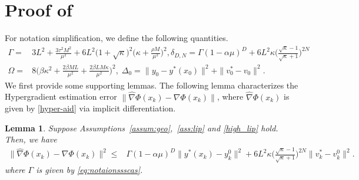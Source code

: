 \documentclass{osudissert96}
\newtheorem{lemma}{Lemma}
\begin{document}
\section{Proof of }\label{appen:aid-bio}
For notation simplification, we define the following quantities. 
{\small\begin{align}\label{eq:notaionssscas}
\Gamma =&3L^2+\frac{3\tau^2 M^2}{\mu^2} + 6L^2\big(1+\sqrt{\kappa}\big)^2\big(\kappa +\frac{\rho M}{\mu^2}\big)^2, \delta_{D,N}=\Gamma (1-\alpha \mu)^D  + 6L^2 \kappa \big( \frac{\sqrt{\kappa}-1}{\sqrt{\kappa}+1} \big)^{2N}
\nonumber
\\\Omega =&8\Big(\beta\kappa^2+\frac{2\beta ML}{\mu^2}+\frac{2\beta LM\kappa}{\mu^2}\Big)^2,\; \Delta_0 = \|y_0-y^*(x_{0})\|^2 + \|v_{0}^*-v_0\|^2.
\end{align}}
\hspace{-0.15cm}We first provide some supporting lemmas. The following lemma 
characterizes the Hypergradient estimation error $\|\widehat \nabla \Phi(x_k)- \nabla \Phi(x_k)\|$, where $\widehat \nabla \Phi(x_k)$ is given by \cref{hyper-aid} via implicit differentiation. 
\begin{lemma}\label{le:aidhy}
Suppose Assumptions~\ref{assum:geo},~\ref{ass:lip} and \ref{high_lip} hold.  
Then, we have 
\begin{align}
\|\widehat \nabla \Phi(x_k)- \nabla \Phi(x_k)\|^2 \leq &\Gamma (1-\alpha \mu)^D \|y^*(x_k)-y_k^0\|^2 + 6L^2 \kappa \Big( \frac{\sqrt{\kappa}-1}{\sqrt{\kappa}+1} \Big)^{2N}\|v_k^*-v_k^0\|^2. \nonumber
\end{align}
where $\Gamma$ is given by \cref{eq:notaionssscas}. 
\end{lemma}
\end{document}
